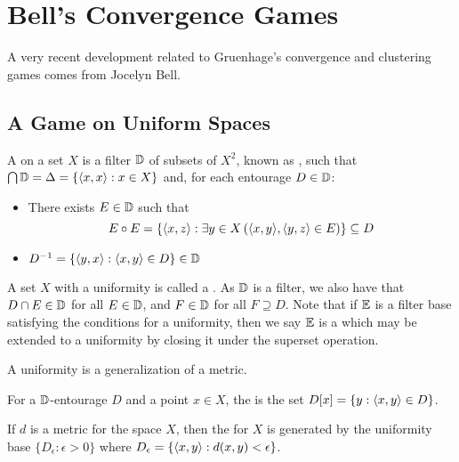 
\chapter{Bell's Convergence Games}

A very recent development related to Gruenhage's convergence and
clustering games comes from
Jocelyn Bell.



\section{A Game on Uniform Spaces}

\begin{defn}
  A  on a set $X$ is a filter $\mathbb{D}$ of subsets of $X^2$,
  known as , such that
  $\bigcap\mathbb{D}=\Delta=\{\langle x,x\rangle:x\in X\}$ and, for each entourage $D\in\mathbb{D}$:
  \begin{itemize}
    \item There exists ${E}\in\mathbb{D}$ such that
      \[
        {E}\circ{E}
          =
        \left\{\langle x,z\rangle:\exists y\in X\left(\langle x,y\rangle,\langle y,z\rangle\in{E}\right)\right\}
          \subseteq
        D
      \]
    \item $D^{-1}=\{\langle y,x\rangle:\langle x,y\rangle\in D\}\in \mathbb{D}$
  \end{itemize}
\end{defn}

A set $X$ with a uniformity is called a .
As $\mathbb{D}$ is a filter, we also have that $D\cap E\in \mathbb{D}$ for all
$E\in\mathbb{D}$, and $F\in \mathbb{D}$ for all $F\supseteq D$. Note that if $\mathbb{E}$ is
a filter base satisfying the conditions for a uniformity, then we say
$\mathbb{E}$ is a  which may be extended to a uniformity by
closing it under the superset operation.

A uniformity is a generalization of a metric.

\begin{defn}
  For a $\mathbb{D}$-entourage $D$ and a point $x\in X$, the
   is the set $D[x]=\{y:\langle x,y\rangle\in D\}$.
\end{defn}

\begin{defn}
  If $d$ is a metric for the space $X$, then the  for
  $X$ is generated by the uniformity base $\{D_\epsilon:\epsilon>0\}$
  where $D_\epsilon = \{\langle x,y\rangle:d(x,y)<\epsilon\}$.
\end{defn}


